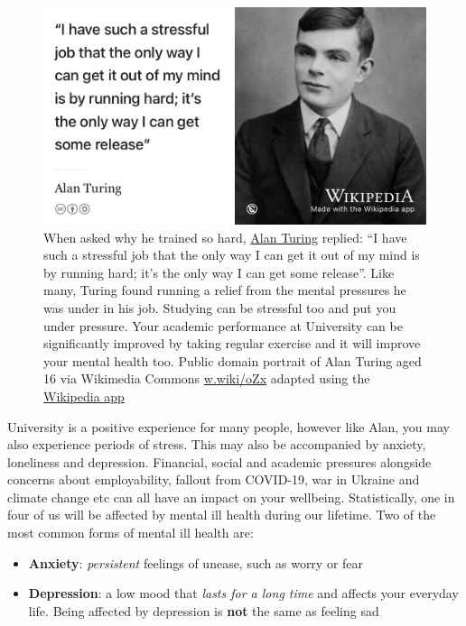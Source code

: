 \documentclass[
]{book}
\providecommand{\tightlist}{%
  \setlength{\itemsep}{0pt}\setlength{\parskip}{0pt}}
\begin{document}
\begin{figure}

{\centering \includegraphics[width=0.99\linewidth]{images/turunning-machine} 

}

\caption{When asked why he trained so hard, \href{https://en.wikipedia.org/wiki/Alan_Turing}{Alan Turing} replied: ``I have such a stressful job that the only way I can get it out of my mind is by running hard; it's the only way I can get some release''. Like many, Turing found running a relief from the mental pressures he was under in his job. \citep{kottke} Studying can be stressful too and put you under pressure. Your academic performance at University can be significantly improved by taking regular exercise and it will improve your mental health too. Public domain portrait of Alan Turing aged 16 via Wikimedia Commons \href{https://w.wiki/oZx}{w.wiki/oZx} adapted using the \href{https://apps.apple.com/gb/app/wikipedia/id324715238}{Wikipedia app}}\label{fig:turing-stress-fig}
\end{figure}



University is a positive experience for many people, however like Alan, you may also experience periods of stress. This may also be accompanied by anxiety, loneliness and depression. Financial, social and academic pressures alongside concerns about employability, fallout from COVID-19, war in Ukraine and climate change etc can all have an impact on your wellbeing. Statistically, one in four of us will be affected by mental ill health during our lifetime. Two of the most common forms of mental ill health are:

\begin{itemize}
\tightlist
\item
  \textbf{Anxiety}: \emph{persistent} feelings of unease, such as worry or fear
\item
  \textbf{Depression}: a low mood that \emph{lasts for a long time} and affects your everyday life. Being affected by depression is \textbf{not} the same as feeling sad
\end{itemize}
\end{document}
